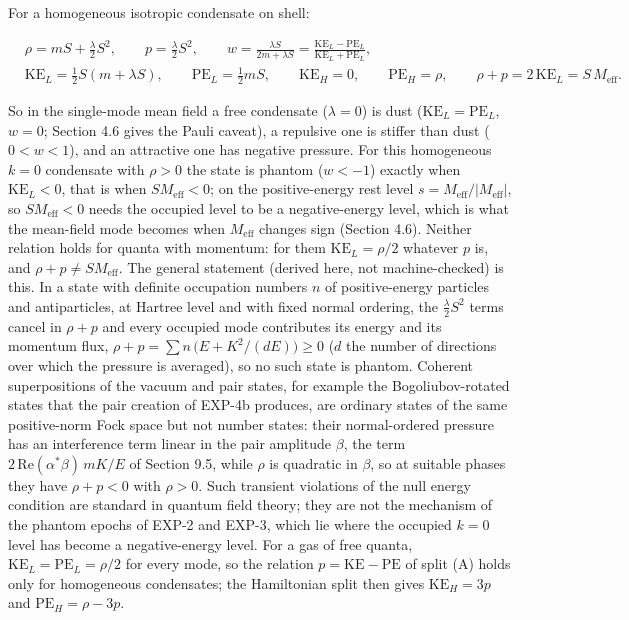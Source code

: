 \documentclass[11pt]{article}
\begin{document}
For a homogeneous isotropic condensate on shell:

\[
\begin{aligned}
&\rho=mS+\tfrac\lambda2S^2,\qquad p=\tfrac\lambda2S^2,\qquad w=\frac{\lambda S}{2m+\lambda S}=\frac{\mathrm{KE}_L-\mathrm{PE}_L}{\mathrm{KE}_L+\mathrm{PE}_L},\\
&\mathrm{KE}_L=\tfrac12S(m+\lambda S),\qquad \mathrm{PE}_L=\tfrac12mS,\qquad \mathrm{KE}_H=0,\qquad \mathrm{PE}_H=\rho,\qquad \rho+p=2\,\mathrm{KE}_L=S\,M_{\mathrm{eff}} .
\end{aligned}
\]

So in the single-mode mean field a free condensate ($\lambda=0$) is dust ($\mathrm{KE}_L=\mathrm{PE}_L$, $w=0$; Section 4.6 gives the Pauli caveat), a repulsive one is stiffer than dust ($0<w<1$), and an attractive one has negative pressure. For this homogeneous $k=0$ condensate with $\rho>0$ the state is phantom ($w<-1$) exactly when $\mathrm{KE}_L<0$, that is when $SM_{\mathrm{eff}}<0$; on the positive-energy rest level $s=M_{\mathrm{eff}}/|M_{\mathrm{eff}}|$, so $SM_{\mathrm{eff}}<0$ needs the occupied level to be a negative-energy level, which is what the mean-field mode becomes when $M_{\mathrm{eff}}$ changes sign (Section 4.6). Neither relation holds for quanta with momentum: for them $\mathrm{KE}_L=\rho/2$ whatever $p$ is, and $\rho+p\ne SM_{\mathrm{eff}}$. The general statement (derived here, not machine-checked) is this. In a state with definite occupation numbers $n$ of positive-energy particles and antiparticles, at Hartree level and with fixed normal ordering, the $\tfrac\lambda2S^2$ terms cancel in $\rho+p$ and every occupied mode contributes its energy and its momentum flux, $\rho+p=\sum n\,\bigl(E+K^2/(dE)\bigr)\ge0$ ($d$ the number of directions over which the pressure is averaged), so no such state is phantom. Coherent superpositions of the vacuum and pair states, for example the Bogoliubov-rotated states that the pair creation of EXP-4b produces, are ordinary states of the same positive-norm Fock space but not number states: their normal-ordered pressure has an interference term linear in the pair amplitude $\beta$, the term $2\,\mathrm{Re}(\alpha^\ast\beta)\,mK/E$ of Section 9.5, while $\rho$ is quadratic in $\beta$, so at suitable phases they have $\rho+p<0$ with $\rho>0$. Such transient violations of the null energy condition are standard in quantum field theory; they are not the mechanism of the phantom epochs of EXP-2 and EXP-3, which lie where the occupied $k=0$ level has become a negative-energy level. For a gas of free quanta, $\mathrm{KE}_L=\mathrm{PE}_L=\rho/2$ for every mode, so the relation $p=\mathrm{KE}-\mathrm{PE}$ of split (A) holds only for homogeneous condensates; the Hamiltonian split then gives $\mathrm{KE}_H=3p$ and $\mathrm{PE}_H=\rho-3p$.
\end{document}
